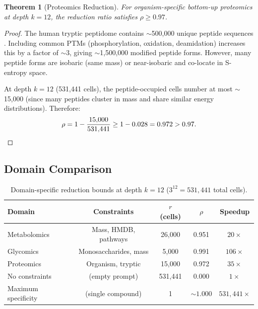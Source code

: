 \documentclass[11pt,twocolumn,a4paper]{article}
\newtheorem{theorem}{Theorem}[section]
\theoremstyle{definition}
\theoremstyle{remark}
\begin{document}
\begin{theorem}[Proteomics Reduction]\label{thm:proteo-reduction}
For organism-specific bottom-up proteomics at depth $k = 12$, the reduction ratio satisfies $\rho \geq 0.97$.
\end{theorem}

\begin{proof}
The human tryptic peptidome contains $\sim$500{,}000 unique peptide sequences \citep{aebersold2003}. Including common PTMs (phosphorylation, oxidation, deamidation) increases this by a factor of $\sim$3, giving $\sim$1{,}500{,}000 modified peptide forms. However, many peptide forms are isobaric (same mass) or near-isobaric and co-locate in S-entropy space.

At depth $k = 12$ (531{,}441 cells), the peptide-occupied cells number at most $\sim$15{,}000 (since many peptides cluster in mass and share similar energy distributions). Therefore:
\begin{equation}
  \rho = 1 - \frac{15{,}000}{531{,}441} \geq 1 - 0.028 = 0.972 > 0.97. \qedhere
\end{equation}
\end{proof}

\subsection{Domain Comparison}\label{sec:domain-comparison}

\begin{table}[!ht]
\centering
\caption{Domain-specific reduction bounds at depth $k = 12$ ($3^{12} = 531{,}441$ total cells).}
\label{tab:domain-comparison}
\begin{tabular}{@{}lcccc@{}}
\toprule
\textbf{Domain} & \textbf{Constraints} & \textbf{$r$ (cells)} & \textbf{$\rho$} & \textbf{Speedup} \\
\midrule
Metabolomics & Mass, HMDB, pathways & 26{,}000 & 0.951 & $20\times$ \\
Glycomics    & Monosaccharides, mass & 5{,}000  & 0.991 & $106\times$ \\
Proteomics   & Organism, tryptic     & 15{,}000 & 0.972 & $35\times$ \\
\midrule
No constraints & (empty prompt)       & 531{,}441 & 0.000 & $1\times$ \\
Maximum specificity & (single compound) & 1 & ${\sim}1.000$ & $531{,}441\times$ \\
\bottomrule
\end{tabular}
\end{table}
\end{document}
